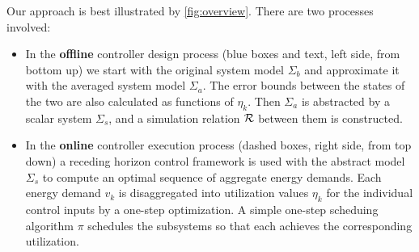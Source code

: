 Our approach is best illustrated by \cref{fig:overview}.
There are two processes involved:
\begin{itemize}
\item In the \textbf{offline} controller design process (blue boxes and text, left side, from bottom
  up) we start with the original system model
  $\Sigma_b$ and approximate it with the averaged system model $\Sigma_a$. The
  error bounds between the states of the two are also calculated as functions
  of $\eta_k$. Then $\Sigma_a$ is abstracted by a scalar system $\Sigma_s$,
  and a simulation relation $\mathcal{R}$ between them is constructed.
  
\item In the \textbf{online} controller execution process (dashed
  boxes, right side, from top down) a receding horizon control
  framework is used with the abstract model $\Sigma_s$ to compute an
  optimal sequence of aggregate energy demands. Each energy demand
  $v_k$ is disaggregated into utilization values $\eta_k$ for the
  individual control inputs by a one-step optimization. A simple
  one-step scheduing algorithm $\pi$ schedules the subsystems so that
  each achieves the corresponding utilization.
\end{itemize}


